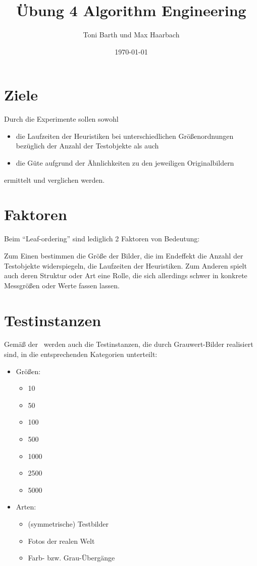 \documentclass[a4paper, 10pt, twoside, onecolumn, parskip]{scrartcl}
\title{Übung 4 Algorithm Engineering} %
\author{{Toni Barth} und {Max Haarbach}} %
\date{\today}			%
\begin{document}
    \maketitle				%

    \section{Ziele} \label{sec:ziele}

    Durch die Experimente sollen sowohl
    \begin{itemize}
        \item die Laufzeiten der Heuristiken bei unterschiedlichen Größenordnungen bezüglich der Anzahl der Testobjekte als auch
        \item die Güte aufgrund der Ähnlichkeiten zu den jeweiligen Originalbildern
    \end{itemize}
    ermittelt und verglichen werden.

    \section{Faktoren} \label{sec:faktoren}

    Beim \enquote{Leaf-ordering} sind lediglich 2 Faktoren von Bedeutung:

    Zum Einen bestimmen die Größe der Bilder, die im Endeffekt die Anzahl der Testobjekte widerspiegeln, die Laufzeiten der Heuristiken.
    Zum Anderen spielt auch deren Struktur oder Art eine Rolle, die sich allerdings schwer in konkrete Messgrößen oder Werte fassen lassen.

    \section{Testinstanzen} \label{sec:testinstanzen}

    Gemäß der~ werden auch die Testinstanzen, die durch Grauwert-Bilder realisiert sind, in die entsprechenden Kategorien unterteilt:
    \begin{itemize}
        \item Größen:
        \begin{itemize}
            \item 10
            \item 50
            \item 100
            \item 500
            \item 1000
            \item 2500
            \item 5000
        \end{itemize}
        \newpage
        \item Arten:
        \begin{itemize}
            \item (symmetrische) Testbilder
            \item Fotos der realen Welt
            \item Farb- bzw. Grau-Übergänge
        \end{itemize}
    \end{itemize}
\end{document}
